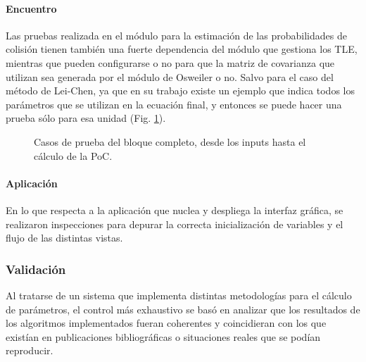 \paragraph*{Encuentro}
Las pruebas realizada en el m\'odulo para la estimaci\'on de las probabilidades de colisi\'on tienen tambi\'en una fuerte dependencia del m\'odulo que gestiona los TLE, mientras que pueden configurarse o no para que la matriz de covarianza que utilizan sea generada por el m\'odulo de Osweiler o no. Salvo para el caso del m\'etodo de Lei-Chen, ya que en su trabajo existe un ejemplo que indica todos los par\'ametros que se utilizan en la ecuaci\'on final, y entonces se puede hacer una prueba s\'olo para esa unidad (Fig. \ref{fig:pruebaEncuentro}).

\begin{figure}
 \centering
 \caption[Casos de Prueba II]{Casos de prueba del bloque completo, desde los inputs hasta el cálculo de la PoC.}
 \label{fig:pruebaEncuentro}
\end{figure}

\paragraph{Aplicaci\'on}
En lo que respecta a la aplicaci\'on que nuclea y despliega la interfaz gr\'afica, se realizaron inspecciones para depurar la correcta inicializaci\'on de variables y el flujo de las distintas vistas. 




\subsubsection*{Validaci\'on}

Al tratarse de un sistema que implementa distintas metodolog\'ias para el c\'alculo de par\'ametros, el control m\'as exhaustivo se bas\'o en analizar que los resultados de los algoritmos implementados fueran coherentes y coincidieran con los que exist\'ian en publicaciones bibliogr\'aficas o situaciones reales que se pod\'ian reproducir. \\

